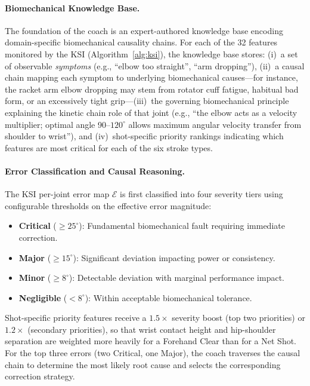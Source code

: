 \documentclass[pdflatex,sn-mathphys-num]{sn-jnl}
\theoremstyle{thmstyleone}%
\theoremstyle{thmstyletwo}%
\theoremstyle{thmstylethree}%
\begin{document}
\paragraph{Biomechanical Knowledge Base.}
The foundation of the coach is an expert-authored knowledge base encoding domain-specific biomechanical causality chains. For each of the 32 features monitored by the KSI (Algorithm~\ref{alg:ksi}), the knowledge base stores: (i)~a set of observable \textit{symptoms} (e.g., ``elbow too straight'', ``arm dropping''), (ii)~a causal chain mapping each symptom to underlying biomechanical causes---for instance, the racket arm elbow dropping may stem from rotator cuff fatigue, habitual bad form, or an excessively tight grip---(iii)~the governing biomechanical principle explaining the kinetic chain role of that joint (e.g., ``the elbow acts as a velocity multiplier; optimal angle 90--$120^{\circ}$ allows maximum angular velocity transfer from shoulder to wrist''), and (iv)~shot-specific priority rankings indicating which features are most critical for each of the six stroke types.

\paragraph{Error Classification and Causal Reasoning.}
The KSI per-joint error map $\mathcal{E}$ is first classified into four severity tiers using configurable thresholds on the effective error magnitude:
\begin{itemize}
    \item \textbf{Critical} ($\geq 25^{\circ}$): Fundamental biomechanical fault requiring immediate correction.
    \item \textbf{Major} ($\geq 15^{\circ}$): Significant deviation impacting power or consistency.
    \item \textbf{Minor} ($\geq 8^{\circ}$): Detectable deviation with marginal performance impact.
    \item \textbf{Negligible} ($< 8^{\circ}$): Within acceptable biomechanical tolerance.
\end{itemize}
Shot-specific priority features receive a $1.5\times$ severity boost (top two priorities) or $1.2\times$ (secondary priorities), so that wrist contact height and hip-shoulder separation are weighted more heavily for a Forehand Clear than for a Net Shot. For the top three errors (two Critical, one Major), the coach traverses the causal chain to determine the most likely root cause and selects the corresponding correction strategy.
\end{document}
